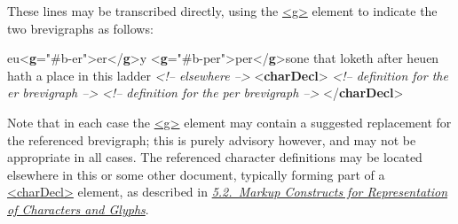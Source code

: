  These lines may be transcribed directly, using the \hyperref[TEI.g]{<g>} element to indicate the two brevigraphs as follows: \par\bgroup{}\exampleFont \begin{shaded}\noindent\mbox{}eu{<\textbf{g}\hspace*{1em}{ref}="{\#b-er}">}er{</\textbf{g}>}y {<\textbf{g}\hspace*{1em}{ref}="{\#b-per}">}per{</\textbf{g}>}sone that loketh after heuen hath a place in\mbox{}\newline 
 this ladder \mbox{}\newline 
\textit{<!-- elsewhere -->}\mbox{}\newline 
{<\textbf{charDecl}>}\mbox{}\newline 
{}\mbox{}\newline 
\textit{<!-- definition for the er brevigraph -->}\mbox{}\newline 
{}\mbox{}\newline 
{}\mbox{}\newline 
\textit{<!-- definition for the per brevigraph -->}\mbox{}\newline 
{}\mbox{}\newline 
{</\textbf{charDecl}>}\end{shaded}\egroup\par \noindent  Note that in each case the \hyperref[TEI.g]{<g>} element may contain a suggested replacement for the referenced brevigraph; this is purely advisory however, and may not be appropriate in all cases. The referenced character definitions may be located elsewhere in this or some other document, typically forming part of a \hyperref[TEI.charDecl]{<charDecl>} element, as described in \textit{\hyperref[D25-20]{5.2.\ Markup Constructs for Representation of Characters and Glyphs}}.\par
